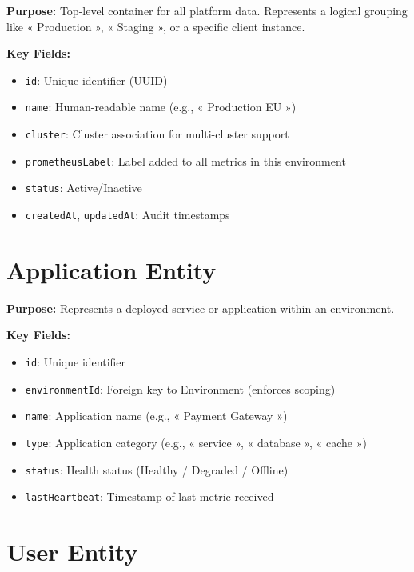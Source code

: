 \documentclass[12pt,a4paper]{report}
\begin{document}
\begin{tcolorbox}
  \textbf{Purpose:} Top-level container for all platform data. Represents a logical grouping like « Production », « Staging », or a specific client instance.
  
  \textbf{Key Fields:}
  \begin{itemize}
    \item \texttt{id}: Unique identifier (UUID)
    \item \texttt{name}: Human-readable name (e.g., « Production EU »)
    \item \texttt{cluster}: Cluster association for multi-cluster support
    \item \texttt{prometheusLabel}: Label added to all metrics in this environment
    \item \texttt{status}: Active/Inactive
    \item \texttt{createdAt}, \texttt{updatedAt}: Audit timestamps
  \end{itemize}
\end{tcolorbox}

\section{Application Entity}

\begin{tcolorbox}
  \textbf{Purpose:} Represents a deployed service or application within an environment.
  
  \textbf{Key Fields:}
  \begin{itemize}
    \item \texttt{id}: Unique identifier
    \item \texttt{environmentId}: Foreign key to Environment (enforces scoping)
    \item \texttt{name}: Application name (e.g., « Payment Gateway »)
    \item \texttt{type}: Application category (e.g., « service », « database », « cache »)
    \item \texttt{status}: Health status (Healthy / Degraded / Offline)
    \item \texttt{lastHeartbeat}: Timestamp of last metric received
  \end{itemize}
\end{tcolorbox}

\section{User Entity}
\end{document}
